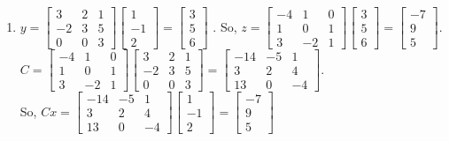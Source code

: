 \documentclass{article}
\begin{document}
\begin{enumerate}
	\item $y = 
	\begin{bmatrix}
		3	&2	&1\\
		-2	&3	&5\\
		0	&0	&3
	\end{bmatrix}
	\begin{bmatrix}
		1\\
		-1\\
		2
	\end{bmatrix}
	= 
	\begin{bmatrix}
		3\\	
		5\\
		6
	\end{bmatrix}
	$ . So, $z = 
	\begin{bmatrix}
		-4	&1	&0\\
		1	&0	&1\\
		3	&-2	&1
	\end{bmatrix}
	\begin{bmatrix}
		3\\
		5\\
		6
	\end{bmatrix}
	= 
	\begin{bmatrix}
		-7\\
		9\\
		5
	\end{bmatrix}
	$. $C = 
	\begin{bmatrix}
		-4	&1	&0\\
		1	&0	&1\\
		3	&-2	&1
	\end{bmatrix}
	\begin{bmatrix}
		3	&2	&1\\
		-2	&3	&5\\
		0	&0	&3
	\end{bmatrix}
	= 
	\begin{bmatrix}
		-14	&-5 	&1\\
		3	&2	&4\\
		13	&0	&-4
	\end{bmatrix}
	$. \\
	So, $Cx = 
	\begin{bmatrix}
		-14	&-5 	&1\\
		3	&2	&4\\
		13	&0	&-4
	\end{bmatrix}
	\begin{bmatrix}
		1\\
		-1\\
		2
	\end{bmatrix}
	= 
	\begin{bmatrix}
		-7\\
		9\\
		5
	\end{bmatrix}$
	

\end{enumerate}
\end{document}
